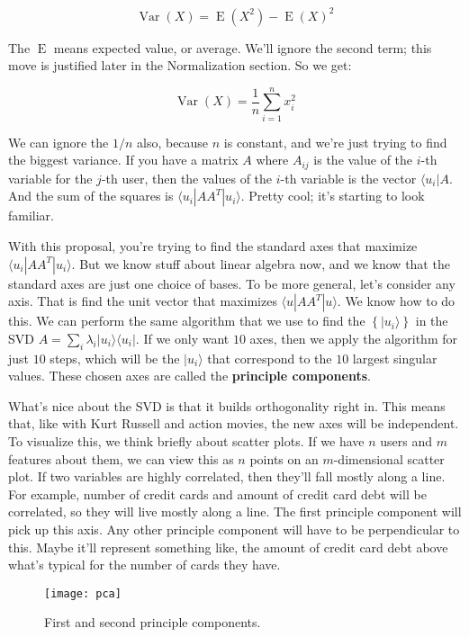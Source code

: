 \documentclass{amsbook}
\begin{document}
\begin{equation}
\label{var}
\operatorname{Var}(X) = \operatorname{E}(X^2) - \operatorname{E}(X)^2
\end{equation}

The $\operatorname{E}$ means expected value, or average.  We'll ignore the second term; this move is justified later in the Normalization section.  So we get:

$$
\operatorname{Var}(X) = \frac{1}{n}\sum_{i=1}^n x_i^2
$$

We can ignore the $1/n$ also, because $n$ is constant, and we're just trying to find the biggest variance.  If you have a matrix $A$ where $A_{ij}$ is the value of the $i$-th variable for the $j$-th user, then the values of the $i$-th variable is the vector $\langle u_i|A$.  And the sum of the squares is $\langle u_i|AA^T|u_i\rangle$.  Pretty cool; it's starting to look familiar.

With this proposal, you're trying to find the standard axes that maximize $\langle u_i|AA^T|u_i\rangle$.  But we know stuff about linear algebra now, and we know that the standard axes are just one choice of bases.  To be more general, let's consider any axis.  That is find the unit vector that maximizes $\langle u|AA^T|u\rangle$.  We know how to do this.  We can perform the same algorithm that we use to find the $\left\{|u_i\rangle\right\}$ in the SVD $A=\sum_i\lambda_i|u_i\rangle\langle u_i|$.  If we only want $10$ axes, then we apply the algorithm for just $10$ steps, which will be the $|u_i\rangle$ that correspond to the $10$ largest singular values.  These chosen axes are called the {\bf principle components}.

What's nice about the SVD is that it builds orthogonality right in.  This means that, like with Kurt Russell and action movies, the new axes will be independent.  To visualize this, we think briefly about scatter plots.  If we have $n$ users and $m$ features about them, we can view this as $n$ points on an $m$-dimensional scatter plot.  If two variables are highly correlated, then they'll fall mostly along a line.  For example, number of credit cards and amount of credit card debt will be correlated, so they will live mostly along a line.  The first principle component will pick up this axis.  Any other principle component will have to be perpendicular to this.  Maybe it'll represent something like, the amount of credit card debt above what's typical for the number of cards they have.

\begin{figure}
\caption{First and second principle components.}
\centering
\texttt{[image: pca]}
\end{figure}
\end{document}
